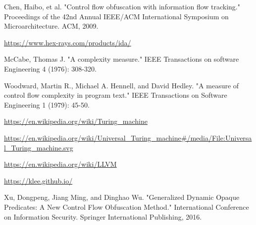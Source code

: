 \documentclass[lnicst]{svmultln}
\begin{document}
\begin{thebibliography}{5}
 Chen, Haibo, et al. "Control flow obfuscation with information flow tracking." Proceedings of the 42nd Annual IEEE/ACM International Symposium on Microarchitecture. ACM, 2009.

 \url{https://www.hex-rays.com/products/ida/}

 McCabe, Thomas J. "A complexity measure." IEEE Transactions on software Engineering 4 (1976): 308-320.

 Woodward, Martin R., Michael A. Hennell, and David Hedley. "A measure of control flow complexity in program text." IEEE Transactions on Software Engineering 1 (1979): 45-50.

 \url{https://en.wikipedia.org/wiki/Turing_machine}

 \url{https://en.wikipedia.org/wiki/Universal_Turing_machine#/media/File:Universal_Turing_machine.svg}

 \url{https://en.wikipedia.org/wiki/LLVM}

 \url{https://klee.github.io/}

 Xu, Dongpeng, Jiang Ming, and Dinghao Wu. "Generalized Dynamic Opaque Predicates: A New Control Flow Obfuscation Method." International Conference on Information Security. Springer International Publishing, 2016.


\end{thebibliography}
%
\end{document}
